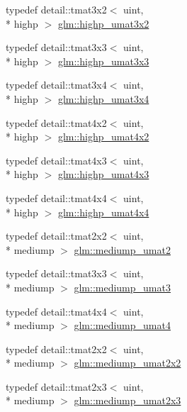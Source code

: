 \begin{DoxyCompactItemize}
\item 
typedef detail\-::tmat3x2$<$ uint, \\*
highp $>$ \hyperlink{group__gtc__matrix__integer_ga6f6a73ec605a515fb21d779663082ef9}{glm\-::highp\-\_\-umat3x2}
\item 
typedef detail\-::tmat3x3$<$ uint, \\*
highp $>$ \hyperlink{group__gtc__matrix__integer_ga8dd9f8bfe06de34c8f1a942d2c2e094c}{glm\-::highp\-\_\-umat3x3}
\item 
typedef detail\-::tmat3x4$<$ uint, \\*
highp $>$ \hyperlink{group__gtc__matrix__integer_gabaeb2363acd07cc7f99918bae48ccc05}{glm\-::highp\-\_\-umat3x4}
\item 
typedef detail\-::tmat4x2$<$ uint, \\*
highp $>$ \hyperlink{group__gtc__matrix__integer_ga32442efcb778cb80024a17bafa781f81}{glm\-::highp\-\_\-umat4x2}
\item 
typedef detail\-::tmat4x3$<$ uint, \\*
highp $>$ \hyperlink{group__gtc__matrix__integer_ga763a36c57b6073ca3cac739bfbe794ba}{glm\-::highp\-\_\-umat4x3}
\item 
typedef detail\-::tmat4x4$<$ uint, \\*
highp $>$ \hyperlink{group__gtc__matrix__integer_gaa14b7029cfaf6f26384782f5ff7acddf}{glm\-::highp\-\_\-umat4x4}
\item 
typedef detail\-::tmat2x2$<$ uint, \\*
mediump $>$ \hyperlink{group__gtc__matrix__integer_ga388a5b9d7e494d5f5bd30b9e11ded06a}{glm\-::mediump\-\_\-umat2}
\item 
typedef detail\-::tmat3x3$<$ uint, \\*
mediump $>$ \hyperlink{group__gtc__matrix__integer_ga123f7d8bac8849e3a150bdf8a21e44a2}{glm\-::mediump\-\_\-umat3}
\item 
typedef detail\-::tmat4x4$<$ uint, \\*
mediump $>$ \hyperlink{group__gtc__matrix__integer_gac82f1c426fbca1c4989f0985eb7a4358}{glm\-::mediump\-\_\-umat4}
\item 
typedef detail\-::tmat2x2$<$ uint, \\*
mediump $>$ \hyperlink{group__gtc__matrix__integer_ga80e478f09c6caa16410198ce78fe8a2b}{glm\-::mediump\-\_\-umat2x2}
\item 
typedef detail\-::tmat2x3$<$ uint, \\*
mediump $>$ \hyperlink{group__gtc__matrix__integer_gaaae45c5dbaad1ecd57bfa936d851be1b}{glm\-::mediump\-\_\-umat2x3}

\end{DoxyCompactItemize}
